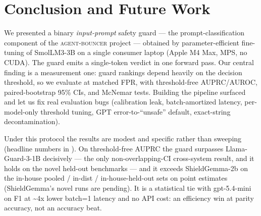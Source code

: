 \documentclass[sigconf,nonacm]{acmart}
\begin{document}



\section{Conclusion and Future Work}

We presented a binary \emph{input-prompt} safety guard --- the prompt-classification component of the \textsc{agent-bouncer} project --- obtained by parameter-efficient fine-tuning of SmolLM3-3B on a single consumer laptop (Apple M4 Max, MPS, no CUDA). The guard emits a single-token verdict in one forward pass. Our central finding is a measurement one: guard rankings depend heavily on the decision threshold, so we evaluate at matched FPR, with threshold-free AUPRC/AUROC, paired-bootstrap 95\% CIs, and McNemar tests. Building the pipeline surfaced and let us fix real evaluation bugs (calibration leak, batch-amortized latency, per-model-only threshold tuning, GPT error-to-``unsafe'' default, exact-string decontamination).

Under this protocol the results are modest and specific rather than sweeping (headline numbers in ). On threshold-free AUPRC the guard surpasses Llama-Guard-3-1B decisively --- the only non-overlapping-CI cross-system result, and it holds on the novel held-out benchmarks --- and it exceeds ShieldGemma-2b on the in-house pooled / in-dist / in-house-held-out sets on point estimates (ShieldGemma's novel runs are pending). It is a statistical tie with gpt-5.4-mini on F1 at \textasciitilde{}4x lower batch=1 latency and no API cost: an efficiency win at parity accuracy, not an accuracy beat.
\end{document}
